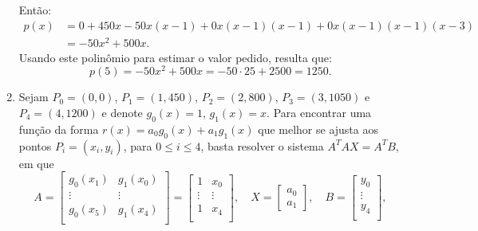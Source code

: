 \documentclass[12pt,a4paper]{article}
\begin{document}
\begin{ExerciseList}
\begin{enumerate}
Então:
\begin{align*}
p(x)
&=0
 +450 x
 -50  x(x-1)
 +0   x(x-1)(x-1)
 +0   x(x-1)(x-1)(x-3)\\
& = -50x^2 + 500x.
\end{align*}
Usando este polinômio para estimar o valor pedido, resulta que:
\[
p(5)
=-50x^2 + 500x
=-50\cdot 25 + 2500
= 1250.
\]
\item Sejam $P_0 = (0,0)$, $P_1 = (1,450)$, $P_2 = (2,800)$, $P_3 = (3,1050)$ e $P_4 = (4,1200)$ e denote $g_0(x) = 1$, $g_1(x) = x$. Para encontrar uma função da forma $r(x) = a_0 g_0(x) + a_1 g_1(x)$ que melhor se ajusta aos pontos $P_i = (x_i,y_i)$, para $0 \leq i \leq 4$, basta resolver o sistema $A^T A X = A^T B$, em que
\[
A
= \begin{bmatrix}
g_0(x_1) & g_1(x_0) \\
\vdots & \vdots\\
g_0(x_5) & g_1(x_4) \\
\end{bmatrix}
= \begin{bmatrix}
1 & x_0 \\
\vdots & \vdots\\
1 & x_4 \\
\end{bmatrix},
\quad
X =
\begin{bmatrix}
a_0\\a_1
\end{bmatrix},
\quad
B = \begin{bmatrix}
y_0 \\
\vdots \\
y_4 \\
\end{bmatrix},
\]


\end{enumerate}
\end{ExerciseList}
\end{document}
